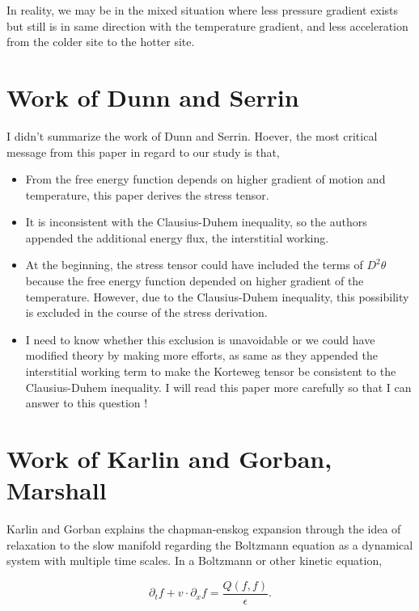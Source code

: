 \documentclass[a4paper,12pt]{article}
\begin{document}
\begin{enumerate}
In reality, we may be in the mixed situation where less pressure gradient exists but still is in same direction with the temperature gradient, and less acceleration from the colder site to the hotter site.
\end{enumerate}

\section{Work of Dunn and Serrin}
I didn't summarize the work of Dunn and Serrin. Hoever, the most critical message from this paper in regard to our study is that,
\begin{itemize}
 \item From the free energy function depends on higher gradient of motion and temperature, this paper derives the stress tensor.
 \item It is inconsistent with the Clausius-Duhem inequality, so the authors appended the additional energy flux, the interstitial working.
 \item At the beginning, the stress tensor could have included the terms of $D^2\theta$ because the free energy function depended on higher gradient of the temperature. However, due to the Clausius-Duhem inequality, this possibility is excluded in the course of the stress derivation.
 \item I need to know whether this exclusion is unavoidable or we could have modified theory by making more efforts, as same as they appended the interstitial working term to make the Korteweg tensor be consistent to the Clausius-Duhem inequality. I will read this paper more carefully so that I can answer to this question !
\end{itemize}

\section{Work of Karlin and Gorban, Marshall}
Karlin and Gorban explains the chapman-enskog expansion through the idea of relaxation to the slow manifold regarding the Boltzmann equation as a dynamical system with multiple time scales. In a Boltzmann or other kinetic equation,

{{{$$ \partial_t f + v \cdot \partial_x f = \frac{Q(f,f)}{\epsilon}. $$}}}
\end{document}
